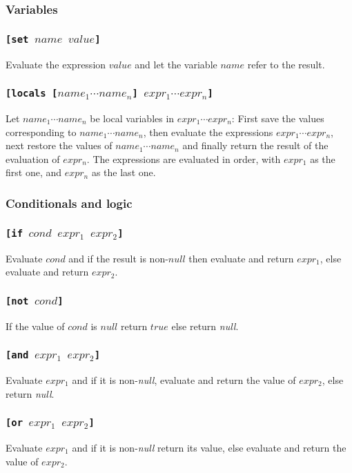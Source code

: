\documentclass[11pt]{report}
\begin{document}
\subsubsection{Variables}
\subsubsection*{\tt{[set }$name$ $value$\tt{]}}
Evaluate the expression $value$ and let the variable $name$ refer to the result.

\subsubsection*{\tt{[locals [}$name_1 \cdots name_n$\tt{]} $expr_1 \cdots expr_n$\tt{]}}
Let $name_1 \cdots name_n$ be local variables in $expr_1 \cdots expr_n$: First save the values corresponding to $name_1 \cdots name_n$, then evaluate the expressions $expr_1 \cdots expr_n$, next restore the values of $name_1 \cdots name_n$ and finally return the result of the evaluation of $expr_n$. The expressions are evaluated in order, with $expr_1$ as the first one, and $expr_n$ as the last one.

\subsubsection{Conditionals and logic}
\subsubsection*{\tt{[if }$cond$ $expr_1$ $expr_2$\tt{]}}
Evaluate $cond$ and if the result is non-$null$ then evaluate and return $expr_1$, else evaluate and return $expr_2$.

\subsubsection*{\tt{[not }$cond$\tt{]}}
If the value of $cond$ is $null$ return $true$ else return \textit{null}.

\subsubsection*{\tt{[and }$expr_1$ $expr_2$\tt{]}}
Evaluate $expr_1$ and if it is non-\textit{null}, evaluate and return the value of $expr_2$, else return \textit{null}.

\subsubsection*{\tt{[or }$expr_1$ $expr_2$\tt{]}}
Evaluate $expr_1$ and if it is non-\textit{null} return its value, else evaluate and return the value of $expr_2$.
\end{document}
